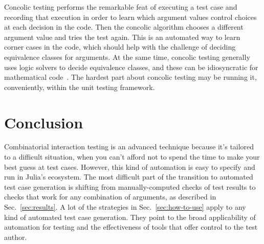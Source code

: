 \documentclass{juliacon}
\begin{document}
\vskip 6pt
Concolic testing performs the remarkable feat of executing a test case and recording that execution in order to learn which argument values control choices at each decision in the code. Then the concolic algorithm chooses a different argument value and tries the test again. This is an automated way to learn corner cases in the code, which should help with the challenge of deciding equivalence classes for arguments. At the same time, concolic testing generally uses logic solvers to decide equivalence classes, and these can be idiosyncratic for mathematical code~\cite{King1976-jt,Wang2018-xh}. The hardest part about concolic testing may be running it, conveniently, within the unit testing framework.

\section{Conclusion}
Combinatorial interaction testing is an advanced technique because it's tailored to a difficult situation, when you can't afford not to spend the time to make your best guess at test cases. However, this kind of automation is easy to specify and run in Julia's ecosystem. The most difficult part of the transition to automated test case generation is shifting from manually-computed checks of test results to checks that work for any combination of arguments, as described in Sec.~\ref{sec:results}. A lot of the strategies in Sec.~\ref{sec:how-to-use} apply to any kind of automated test case generation. They point to the broad applicability of automation for testing and the effectiveness of tools that offer control to the test author.


\end{document}
